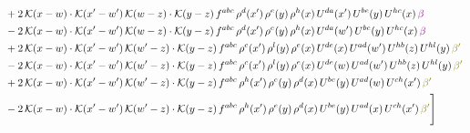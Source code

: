 \documentclass[9pt]{article}
\numberwithin{equation}{section}
\begin{document}
\begin{align}
& +2\,\mathcal{K}(x-w)\cdot \mathcal{K}(x'-w')\, \mathcal{K}(w-z)\cdot \mathcal{K}(y-z)\, f^{abc}\,\rho^{d}(x')\,\rho^{e}(y)\,\rho^{h}(x)\, U^{da}(x')\,U^{be}(y)\,U^{hc}(x)\,{\color{violet} \beta}\notag\\
& -2\,\mathcal{K}(x-w)\cdot \mathcal{K}(x'-w')\, \mathcal{K}(w-z)\cdot \mathcal{K}(y-z)\, f^{abc}\,\rho^{d}(x')\,\rho^{e}(y)\,\rho^{h}(x)\, U^{da}(w')\,U^{be}(y)\,U^{hc}(x)\,{\color{violet} \beta}\notag\\
&+2\,\mathcal{K}(x-w)\cdot\mathcal{K}(x'-w')\,\mathcal{K}(w'-z)\cdot\mathcal{K}(y-z)\, f^{abc}\,\rho^{c}(x')\,\rho^{l}(y)\,\rho^{e}(x)\,U^{de}(x)\,U^{ad}(w')\,U^{hb}(z)\,U^{hl}(y)\,{\color{olive} \beta'}\notag \\ &-2\,\mathcal{K}(x-w)\cdot\mathcal{K}(x'-w')\,\mathcal{K}(w'-z)\cdot\mathcal{K}(y-z)\, f^{abc}\,\rho^{c}(x')\,\rho^{l}(y)\,\rho^{e}(x)\,U^{de}(w)\,U^{ad}(w')\,U^{hb}(z)\,U^{hl}(y)\,{\color{olive} \beta'}\notag \\ & +2\,\mathcal{K}(x-w)\cdot\mathcal{K}(x'-w')\,\mathcal{K}(w'-z)\cdot\mathcal{K}(y-z)\, f^{abc}\,\rho^{h}(x')\,\rho^{e}(y)\,\rho^{d}(x)\,U^{be}(y)\,U^{ad}(w)\,U^{ch}(x')\,{\color{olive} \beta'} \notag\\ & -2\,\mathcal{K}(x-w)\cdot\mathcal{K}(x'-w')\,\mathcal{K}(w'-z)\cdot\mathcal{K}(y-z)\, f^{abc}\,\rho^{h}(x')\,\rho^{e}(y)\,\rho^{d}(x)\,U^{be}(y)\,U^{ad}(x)\,U^{ch}(x')\,{\color{olive} \beta'} \Bigg]
\end{align}
\end{document}

